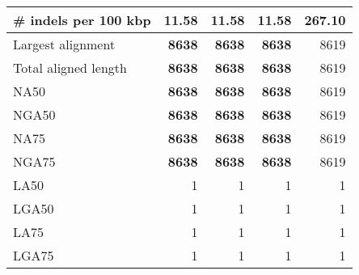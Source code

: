 \documentclass[12pt,a4paper]{article}
\begin{document}
\begin{table}[ht]
\begin{center}
\begin{tabular}{|l*{4}{|r}|}
\# indels per 100 kbp & {\bf 11.58} & {\bf 11.58} & {\bf 11.58} & 267.10 \\ \hline
Largest alignment & {\bf 8638} & {\bf 8638} & {\bf 8638} & 8619 \\ \hline
Total aligned length & {\bf 8638} & {\bf 8638} & {\bf 8638} & 8619 \\ \hline
NA50 & {\bf 8638} & {\bf 8638} & {\bf 8638} & 8619 \\ \hline
NGA50 & {\bf 8638} & {\bf 8638} & {\bf 8638} & 8619 \\ \hline
NA75 & {\bf 8638} & {\bf 8638} & {\bf 8638} & 8619 \\ \hline
NGA75 & {\bf 8638} & {\bf 8638} & {\bf 8638} & 8619 \\ \hline
LA50 & 1 & 1 & 1 & 1 \\ \hline
LGA50 & 1 & 1 & 1 & 1 \\ \hline
LA75 & 1 & 1 & 1 & 1 \\ \hline
LGA75 & 1 & 1 & 1 & 1 \\ \hline
\end{tabular}
\end{center}
\end{table}
\end{document}

